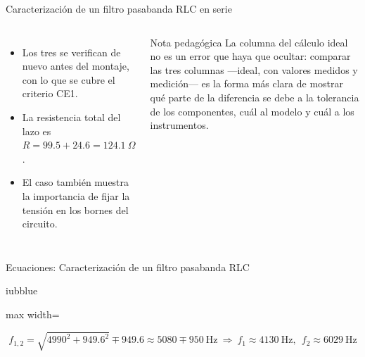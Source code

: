 \documentclass[aspectratio=169,11pt,xcolor={table}]{beamer}
\begin{document}
\begin{frame}{{\normalsize Caracterización de un filtro pasabanda RLC en serie}}
\begin{columns}[c,onlytextwidth]
\small
\begin{itemize}\setlength{\itemsep}{4pt}
  \item Los tres se verifican de nuevo antes del montaje, con lo que se cubre el criterio CE1.
  \item La resistencia total del lazo es $R = 99.5 + 24.6 = 124.1\ \Omega$.
  \item El caso también muestra la importancia de fijar la tensión en los bornes del circuito.
\end{itemize}
\begin{cardO}{Nota pedagógica}
\footnotesize La columna del cálculo ideal no es un error que haya que ocultar: comparar las tres columnas —ideal, con valores medidos y medición— es la forma más clara de mostrar qué parte de la diferencia se debe a la tolerancia de los componentes, cuál al modelo y cuál a los instrumentos.
\end{cardO}
\end{columns}
\end{frame}

\begin{frame}{{\normalsize Ecuaciones: Caracterización de un filtro pasabanda RLC}}
\begin{cajaplana}{iubblue}
\centering
\begin{adjustbox}{max width=\linewidth}
\begin{minipage}{1.83\linewidth}
{\large
\begin{equation*}
  f_{1,2} = \sqrt{4990^{2} + 949.6^{2}} \mp 949.6 \approx 5080 \mp 950\ \text{Hz} \ \Rightarrow\ f_1 \approx 4130\ \text{Hz},\ \ f_2 \approx 6029\ \text{Hz}
\end{equation*}
}
\end{minipage}
\end{adjustbox}
\end{cajaplana}
\end{frame}
\end{document}
